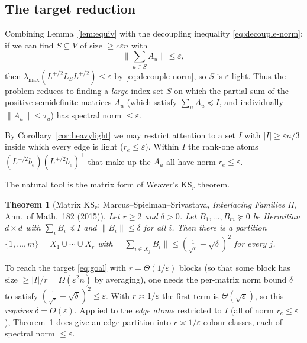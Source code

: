 \documentclass[12pt]{article}
\newtheorem{theorem}{Theorem}
\theoremstyle{definition}
\newcommand{\eps}{\varepsilon}
\newcommand{\psd}{\succeq 0}
\begin{document}
\subsection*{The target reduction}

Combining Lemma~\ref{lem:equiv} with the decoupling inequality \eqref{eq:decouple-norm}: if we can
find $S\subseteq V$ of size $\ge c\eps n$ with
\begin{equation}\label{eq:goal}
\Big\|\sum_{u\in S}A_u\Big\|\le\eps,
\end{equation}
then $\lambda_{\max}(L^{+/2}L_SL^{+/2})\le\eps$ by \eqref{eq:decouple-norm}, so $S$ is $\eps$-light.
Thus the problem reduces to finding a \emph{large} index set $S$ on which the partial sum of the
positive semidefinite matrices $A_u$ (which satisfy $\sum_u A_u\preceq I$, and individually
$\|A_u\|\le\tau_u$) has spectral norm $\le\eps$.

By Corollary~\ref{cor:heavylight} we may restrict attention to a set $I$ with $|I|\ge\eps n/3$ inside
which every edge is light ($r_e\le\eps$). Within $I$ the rank-one atoms
$(L^{+/2}b_e)(L^{+/2}b_e)^\top$ that make up the $A_u$ all have norm $r_e\le\eps$.

The natural tool is the matrix form of Weaver's $\mathrm{KS}_r$ theorem.

\begin{theorem}[Matrix $\mathrm{KS}_r$; Marcus--Spielman--Srivastava, \emph{Interlacing Families II},
Ann.\ of Math.\ 182 (2015)]\label{thm:KS}
Let $r\ge2$ and $\delta>0$. Let $B_1,\dots,B_m\psd$ be Hermitian $d\times d$ with $\sum_i B_i\preceq I$
and $\|B_i\|\le\delta$ for all $i$. Then there is a partition $\{1,\dots,m\}=X_1\cup\cdots\cup X_r$
with $\big\|\sum_{i\in X_j}B_i\big\|\le(\tfrac1{\sqrt r}+\sqrt\delta)^2$ for every $j$.
\end{theorem}

To reach the target \eqref{eq:goal} with $r=\Theta(1/\eps)$ blocks (so that some block has size
$\ge|I|/r=\Omega(\eps^2 n)$ by averaging), one needs the per-matrix norm bound $\delta$ to satisfy
$(\tfrac1{\sqrt r}+\sqrt\delta)^2\le\eps$. With $r\asymp 1/\eps$ the first term is $\Theta(\sqrt\eps)$,
so this \emph{requires} $\delta=O(\eps)$. Applied to the \emph{edge atoms} restricted to $I$
(all of norm $r_e\le\eps$), Theorem~\ref{thm:KS} does give an edge-partition into $r\asymp1/\eps$
colour classes, each of spectral norm $\le\eps$.
\end{document}

